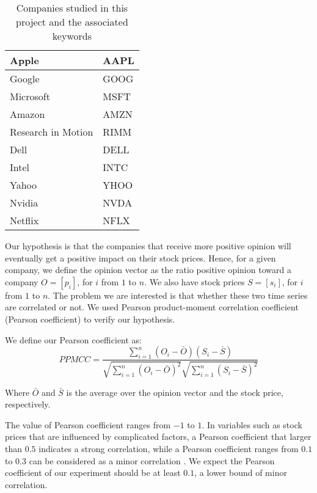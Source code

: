 \documentclass[12pt]{article}
\begin{document}
\begin{table}
\begin{center}
    \begin{tabular}{ | l || l | }
        \hline
        Apple &  AAPL \\ \hline
        Google & GOOG \\ \hline
        Microsoft & MSFT \\ \hline
        Amazon & AMZN \\ \hline
        Research in Motion & RIMM \\ \hline
        Dell & DELL \\ \hline
        Intel & INTC \\ \hline
        Yahoo & YHOO \\ \hline
        Nvidia & NVDA \\ \hline
        Netflix & NFLX \\
        \hline
    \end{tabular}
\caption{Companies studied in this project and the associated keywords}
\label{companies-symbols}
\end{center}
\end{table}

Our hypothesis is that the companies that receive more positive opinion will eventually get a positive impact on their stock prices. Hence, for a given company, we define the opinion vector as the ratio positive opinion toward a company $O = [p_i]$, for $i$ from $1$ to $n$. We also have stock prices $S = [s_i]$, for $i$ from $1$ to $n$. The problem we are interested is that whether these two time series are correlated or not. We used Pearson product-moment correlation coefficient (Pearson coefficient) to verify our hypothesis.

We define our Pearson coefficient as:
$$
PPMCC = \frac{\sum_{i=1}^{n}(O_i - \bar{O})(S_i - \bar{S})}{\sqrt{\sum_{i=1}^{n}(O_i - \bar{O})^2}\sqrt{\sum_{i=1}^{n}(S_i - \bar{S})^2}}
$$

Where $\bar{O}$ and $\bar{S}$ is the average over the opinion vector and the stock price, respectively.


The value of Pearson coefficient ranges from $-1$ to $1$. In variables such as stock prices that are influenced by complicated factors, a Pearson coefficient that larger than $0.5$ indicates a strong correlation, while a Pearson coefficient ranges from $0.1$ to $0.3$ can be considered as a minor correlation \cite{Cohen:1988}. We expect the Pearson coefficient of our experiment should be at least $0.1$, a lower bound of minor correlation.
\end{document}
